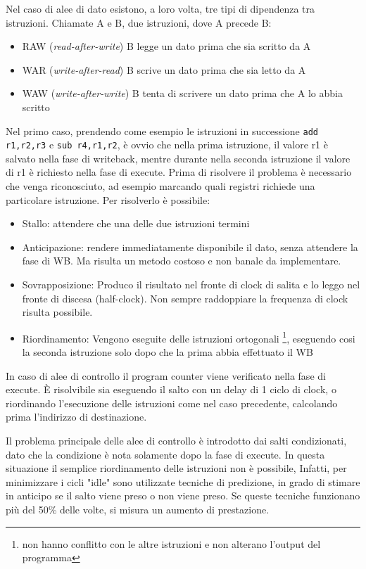 \documentclass[../template]{subfiles}
\begin{document}
Nel caso di alee di dato esistono, a loro volta, tre tipi di dipendenza tra istruzioni.
Chiamate A e B, due istruzioni, dove A precede B:
\begin{itemize}
    \item RAW (\textit{read-after-write}) B legge un dato prima che sia scritto da A
    \item WAR (\textit{write-after-read}) B scrive un dato prima che sia letto da A
    \item WAW (\textit{write-after-write}) B tenta di scrivere un dato prima che A lo abbia scritto
\end{itemize}
Nel primo caso, prendendo come esempio le istruzioni in successione \lstinline{add r1,r2,r3} e \lstinline{sub r4,r1,r2}, è ovvio che
nella prima istruzione, il valore r1 è salvato nella fase di writeback, mentre durante nella seconda istruzione il
valore di r1 è richiesto nella fase di execute.
Prima di risolvere il problema è necessario che venga riconosciuto, ad esempio marcando quali registri richiede una
particolare istruzione.
Per risolverlo è possibile:
\begin{itemize}
    \item Stallo: attendere che una delle due istruzioni termini
    \item Anticipazione: rendere immediatamente disponibile il dato, senza attendere la fase di WB. Ma risulta un metodo
        costoso e non banale da implementare.
    \item Sovrapposizione:
        Produco il risultato nel fronte di clock di salita e lo leggo nel fronte di discesa (half-clock).
        Non sempre raddoppiare la frequenza di clock risulta possibile.
    \item Riordinamento: Vengono eseguite delle istruzioni ortogonali \footnote{non hanno conflitto con le altre
        istruzioni e non alterano l'output del programma}, eseguendo cosi la seconda istruzione solo dopo che la prima abbia effettuato il WB
\end{itemize}

In caso di alee di controllo il program counter viene verificato nella fase di execute.
È risolvibile sia eseguendo il salto con un delay di 1 ciclo di clock, o riordinando l'esecuzione delle istruzioni come
nel caso precedente, calcolando prima l'indirizzo di destinazione.

Il problema principale delle alee di controllo è introdotto dai salti condizionati, dato che la condizione è nota
solamente dopo la fase di execute. In questa situazione il semplice riordinamento delle istruzioni non è possibile,
Infatti, per minimizzare i cicli "idle" sono utilizzate tecniche di predizione, in grado di  stimare in anticipo se il salto viene preso o non viene preso.
Se queste tecniche funzionano più del 50\% delle volte, si misura un aumento di prestazione.
\end{document}
